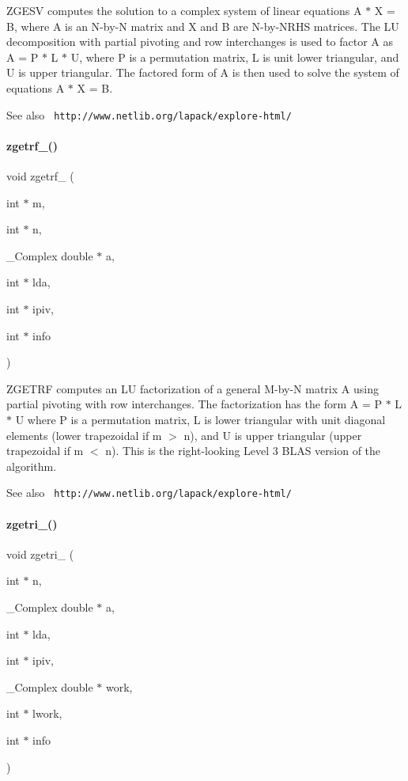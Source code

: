 Z\+G\+E\+SV computes the solution to a complex system of linear equations A $\ast$ X = B, where A is an N-\/by-\/N matrix and X and B are N-\/by-\/\+N\+R\+HS matrices. The LU decomposition with partial pivoting and row interchanges is used to factor A as A = P $\ast$ L $\ast$ U, where P is a permutation matrix, L is unit lower triangular, and U is upper triangular. The factored form of A is then used to solve the system of equations A $\ast$ X = B. \begin{DoxySeeAlso}{See also}
{\texttt{ http\+://www.\+netlib.\+org/lapack/explore-\/html/}} 
\end{DoxySeeAlso}
\mbox{\label{lapack_8h_abf2b176271a76994057aad4be330bb9c}} 
\paragraph{zgetrf\_()}
{\footnotesize\ttfamily void zgetrf\+\_\+ (\begin{DoxyParamCaption}\item[{int $\ast$}]{m,  }\item[{int $\ast$}]{n,  }\item[{\+\_\+\+Complex double $\ast$}]{a,  }\item[{int $\ast$}]{lda,  }\item[{int $\ast$}]{ipiv,  }\item[{int $\ast$}]{info }\end{DoxyParamCaption})}

Z\+G\+E\+T\+RF computes an LU factorization of a general M-\/by-\/N matrix A using partial pivoting with row interchanges. The factorization has the form A = P $\ast$ L $\ast$ U where P is a permutation matrix, L is lower triangular with unit diagonal elements (lower trapezoidal if m $>$ n), and U is upper triangular (upper trapezoidal if m $<$ n). This is the right-\/looking Level 3 B\+L\+AS version of the algorithm. \begin{DoxySeeAlso}{See also}
{\texttt{ http\+://www.\+netlib.\+org/lapack/explore-\/html/}} 
\end{DoxySeeAlso}
\mbox{\label{lapack_8h_ace13790934af89bc9dea51550b50fb31}} 
\paragraph{zgetri\_()}
{\footnotesize\ttfamily void zgetri\+\_\+ (\begin{DoxyParamCaption}\item[{int $\ast$}]{n,  }\item[{\+\_\+\+Complex double $\ast$}]{a,  }\item[{int $\ast$}]{lda,  }\item[{int $\ast$}]{ipiv,  }\item[{\+\_\+\+Complex double $\ast$}]{work,  }\item[{int $\ast$}]{lwork,  }\item[{int $\ast$}]{info }\end{DoxyParamCaption})}

